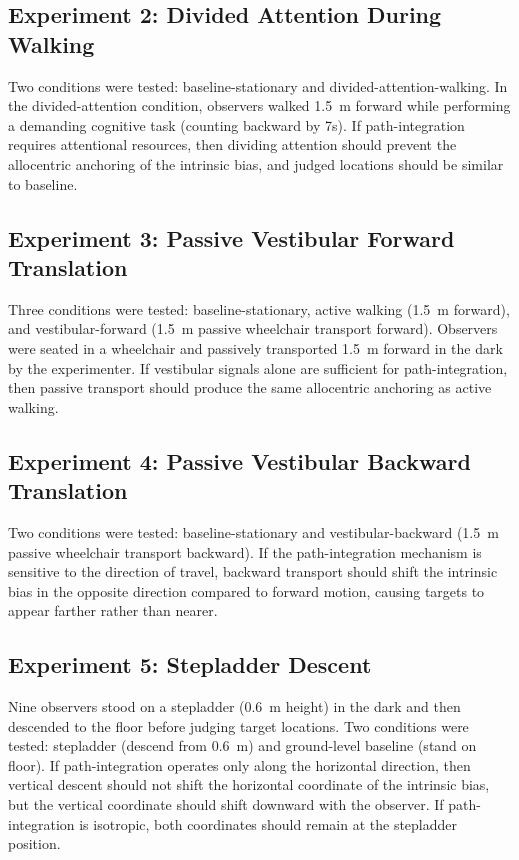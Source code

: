 \documentclass[12pt]{article}
\begin{document}
\subsection{Experiment 2: Divided Attention During Walking}

Two conditions were tested: baseline-stationary and divided-attention-walking. In the divided-attention condition, observers walked 1.5~m forward while performing a demanding cognitive task (counting backward by 7s). If path-integration requires attentional resources, then dividing attention should prevent the allocentric anchoring of the intrinsic bias, and judged locations should be similar to baseline.

\subsection{Experiment 3: Passive Vestibular Forward Translation}

Three conditions were tested: baseline-stationary, active walking (1.5~m forward), and vestibular-forward (1.5~m passive wheelchair transport forward). Observers were seated in a wheelchair and passively transported 1.5~m forward in the dark by the experimenter. If vestibular signals alone are sufficient for path-integration, then passive transport should produce the same allocentric anchoring as active walking.

\subsection{Experiment 4: Passive Vestibular Backward Translation}

Two conditions were tested: baseline-stationary and vestibular-backward (1.5~m passive wheelchair transport backward). If the path-integration mechanism is sensitive to the direction of travel, backward transport should shift the intrinsic bias in the opposite direction compared to forward motion, causing targets to appear farther rather than nearer.

\subsection{Experiment 5: Stepladder Descent}

Nine observers stood on a stepladder (0.6~m height) in the dark and then descended to the floor before judging target locations. Two conditions were tested: stepladder (descend from 0.6~m) and ground-level baseline (stand on floor). If path-integration operates only along the horizontal direction, then vertical descent should not shift the horizontal coordinate of the intrinsic bias, but the vertical coordinate should shift downward with the observer. If path-integration is isotropic, both coordinates should remain at the stepladder position.
\end{document}
